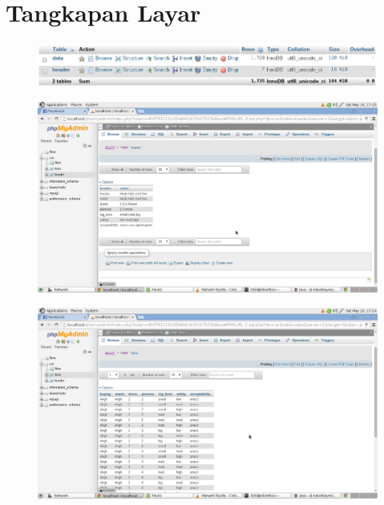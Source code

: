 \documentclass[11pt,a4paper]{report}
\begin{document}
	\section*{Tangkapan Layar}
	\begin{figure}[h]
	\centering
	\includegraphics[width=0.7\linewidth]{database}
	\label{fig:database}
	\end{figure}
	\begin{figure}[h]
		\centering
		\includegraphics[width=0.7\linewidth]{header}
		\label{fig:header}
	\end{figure}
	\begin{figure}[h]
		\centering
		\includegraphics[width=0.7\linewidth]{data}
		\label{fig:data}
	\end{figure}
	\nocite{*}
	
	
\end{document}

